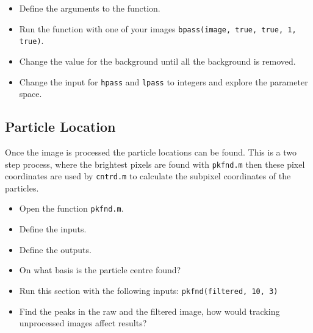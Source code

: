\documentclass[12pt,a4paper,twoside]{article}
\begin{document}
\begin{itemize}
    \item Define the arguments to the function.
    \vspace{1cm}
    \item Run the function with one of your images \lstinline{bpass(image, true, true, 1, true)}.
    \item Change the value for the background until all the background is removed.
    \item Change the input for \lstinline{hpass} and \lstinline{lpass} to integers and explore the parameter space.

 
\end{itemize}

\subsection{Particle Location}

Once the image is processed the particle locations can be found. This is a two step process, where the brightest pixels are found with \lstinline{pkfnd.m} then these pixel coordinates are used by \lstinline{cntrd.m} to calculate the subpixel coordinates of the particles.

\begin{itemize}
    \item Open the function \lstinline{pkfnd.m}.
    \item Define the inputs.
        \vspace{1cm}
    \item Define the outputs.
        \vspace{1cm}
    \item On what basis is the particle centre found?
        \vspace{1cm}
      \item Run this section with the following inputs: \lstinline{pkfnd(filtered, 10, 3)}
        \vspace{1cm}   
    \item Find the peaks in the raw and the filtered image, how would tracking unprocessed images affect results?
        \vspace{1cm}
\end{itemize}
\end{document}
